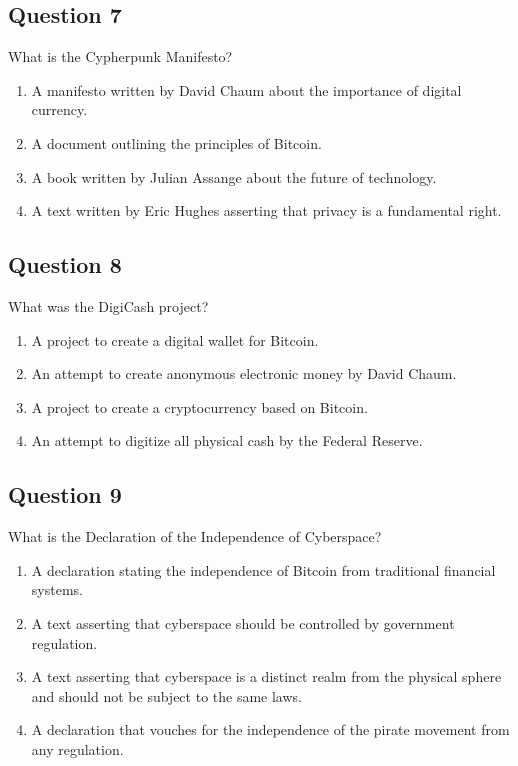 \documentclass[12pt,a4paper]{article}
\begin{document}
\bigskip


\subsection*{Question 7}
What is the Cypherpunk Manifesto?

\begin{enumerate}[label=\Alph*., leftmargin=*]
\item A manifesto written by David Chaum about the importance of digital currency.
\item A document outlining the principles of Bitcoin.
\item A book written by Julian Assange about the future of technology.
\item A text written by Eric Hughes asserting that privacy is a fundamental right.
\end{enumerate}

\bigskip


\subsection*{Question 8}
What was the DigiCash project?

\begin{enumerate}[label=\Alph*., leftmargin=*]
\item A project to create a digital wallet for Bitcoin.
\item An attempt to create anonymous electronic money by David Chaum.
\item A project to create a cryptocurrency based on Bitcoin.
\item An attempt to digitize all physical cash by the Federal Reserve.
\end{enumerate}

\bigskip


\subsection*{Question 9}
What is the Declaration of the Independence of Cyberspace?

\begin{enumerate}[label=\Alph*., leftmargin=*]
\item A declaration stating the independence of Bitcoin from traditional financial systems.
\item A text asserting that cyberspace should be controlled by government regulation.
\item A text asserting that cyberspace is a distinct realm from the physical sphere and should not be subject to the same laws.
\item A declaration that vouches for the independence of the pirate movement from any regulation.
\end{enumerate}
\end{document}
